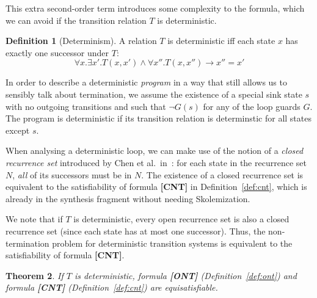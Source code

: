 \documentclass[preprint]{sigplanconf}
\newtheorem{theorem}{Theorem}
\theoremstyle{definition}
\newtheorem{definition}[theorem]{Definition}
\begin{document}
This extra second-order term introduces some complexity to the formula, which
we can avoid if the transition relation $T$ is deterministic.
\begin{definition}[Determinism]
 A relation $T$ is deterministic iff each state $x$ has exactly one successor under $T$:
 $$\forall x . \exists x' . T(x, x') \wedge \forall x'' . T(x, x'') \rightarrow x'' = x'$$
\end{definition}
In order to describe a deterministic \emph{program} in a way that still allows us
to sensibly talk about termination, we assume the existence of a special sink
state $s$ with no outgoing transitions and such that $\lnot G(s)$ for any
of the loop guards $G$.  The program is deterministic if its transition
relation is determinstic for all states except $s$.

When analysing a deterministic loop, we can make use of the notion of a \emph{closed recurrence set}
introduced by Chen et al.~in~\cite{DBLP:conf/tacas/ChenCFNO14}:  for each
state in the recurrence set $N$, \emph{all} of its successors must be in $N$.
The existence of a closed recurrence set is equivalent to the satisfiability
of formula {\bf [CNT]} in Definition~\ref{def:cnt}, which is already in the synthesis
fragment without needing Skolemization.

We note that if $T$ is deterministic, every open recurrence set is also a
closed recurrence set (since each state has at most one successor).  Thus,
the non-termination problem for deterministic transition systems is
equivalent to the satisfiability of formula {\bf [CNT]}.


\begin{theorem}
\label{thm:cnt}
 If $T$ is deterministic,
formula {\bf [ONT]} (Definition~\ref{def:ont}) and formula {\bf [CNT]} (Definition~\ref{def:cnt}) are equisatisfiable.
\end{theorem}

%  

\end{document}
